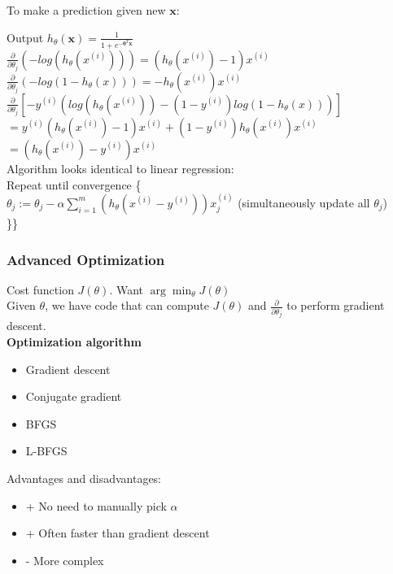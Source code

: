 \documentclass{article}
\newcommand\tab[1][1cm]{\hspace*{#1}}
\newcommand{\vect}[1]{\boldsymbol{#1}}
\begin{document}
To make a prediction given new $\vect{x}$:

\tab Output $h_\theta(\vect{x}) = \frac{1}{1 + e^{-\vect{\theta}^T \vect{x}}}$ \\

$\frac{\partial}{\partial \theta_j}(-log(h_\theta(x^{(i)}))) = (h_\theta(x^{(i)})-1)x^{(i)}$ \\
$\frac{\partial}{\partial \theta_j}(-log(1 - h_\theta(x))) = -h_\theta(x^{(i)})x^{(i)}$ \\

$\frac{\partial}{\partial \theta_j}[-y^{(i)}(log(h_\theta(x^{(i)})) - (1-y^{(i)})log(1 - h_\theta(x)))]$\\
$ = y^{(i)}(h_\theta(x^{(i)})-1)x^{(i)} + (1-y^{(i)})h_\theta(x^{(i)})x^{(i)} $\\
$ = (h_\theta(x^{(i)}) - y^{(i)}) x^{(i)}$\\

Algorithm looks identical to linear regression:\\
Repeat until convergence \{\\
\tab $\theta_j := \theta_j - \alpha \sum_{i=1}^{m}(h_\theta(x^{(i)} - y^{(i)})) x_{j}^{(i)}$ (simultaneously update all $\theta_j$) \\
\}\}\\

\subsubsection{Advanced Optimization}
Cost function $J(\theta)$. Want $\arg\min_\theta J(\theta)$\\
Given $\theta$, we have code that can compute $J(\theta)$ and $\frac{\partial}{\partial \theta_j}$ to perform gradient descent.\\

\textbf{Optimization algorithm}
\begin{itemize}
  \item Gradient descent
  \item Conjugate gradient
  \item BFGS
  \item L-BFGS
\end{itemize}

Advantages and disadvantages:
\begin{itemize}
  \item + No need to manually pick $\alpha$
  \item + Often faster than gradient descent
  \item - More complex
\end{itemize}
\end{document}
